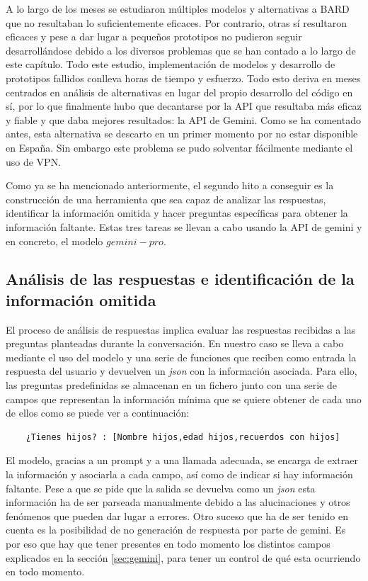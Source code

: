 A lo largo de los meses se estudiaron múltiples modelos y alternativas a BARD que no resultaban lo suficientemente eficaces. Por contrario, otras sí resultaron eficaces y pese a dar lugar a pequeños prototipos no pudieron seguir desarrollándose debido a los diversos problemas que se han contado a lo largo de este capítulo. Todo este estudio, implementación de modelos y desarrollo de prototipos fallidos conlleva horas de tiempo y esfuerzo. Todo esto deriva en meses centrados en análisis de alternativas en lugar del propio desarrollo del código en sí, por lo que finalmente hubo que decantarse por la API que resultaba más eficaz y fiable y que daba mejores resultados: la API de Gemini. Como se ha comentado antes, esta alternativa se descarto en un primer momento por no estar disponible en España. Sin embargo este problema se pudo solventar fácilmente mediante el uso de VPN. 

Como ya se ha mencionado anteriormente, el segundo hito a conseguir es la construcción de una herramienta que sea capaz de analizar las respuestas, identificar la información omitida y hacer preguntas específicas para obtener la información faltante. Estas tres tareas se llevan a cabo usando la API de gemini y en concreto, el modelo $gemini-pro$. 

\subsection{Análisis de las respuestas e identificación de la información omitida}

El proceso de análisis de respuestas implica evaluar las respuestas recibidas a las preguntas planteadas durante la conversación. En nuestro caso se lleva a cabo mediante el uso del modelo y una serie de funciones que reciben como entrada la respuesta del usuario y devuelven un \textit{json} con la información asociada. Para ello, las preguntas predefinidas se almacenan en un fichero junto con una serie de campos que representan la información mínima que se quiere obtener de cada uno de ellos como se puede ver a continuación:
\begin{verbatim}
	¿Tienes hijos? : [Nombre hijos,edad hijos,recuerdos con hijos]
\end{verbatim}


El modelo, gracias a un prompt y a una llamada adecuada, se encarga de extraer la información y asociarla a cada campo, así como de indicar si hay información faltante. Pese a que se pide que la salida se devuelva como un \textit{json} esta información ha de ser parseada manualmente debido a las alucinaciones y otros fenómenos que pueden dar lugar a errores. Otro suceso que ha de ser tenido en cuenta es la posibilidad de no generación de respuesta por parte de gemini. Es por eso que hay que tener presentes en todo momento los distintos campos explicados en la sección \ref{sec:gemini}, para tener un control de qué esta ocurriendo en todo momento. 

